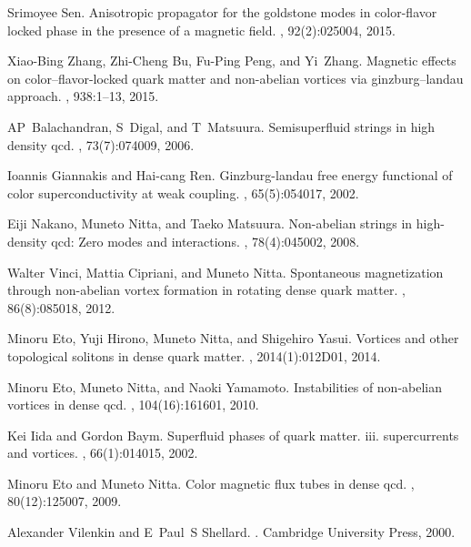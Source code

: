 \documentclass[prd, showpacs,nofootinbib,amsmath,amssymb]{revtex4}
\begin{document}
\begin{thebibliography}{99}
Srimoyee Sen.
\newblock Anisotropic propagator for the goldstone modes in color-flavor locked
  phase in the presence of a magnetic field.
, 92(2):025004, 2015.

Xiao-Bing Zhang, Zhi-Cheng Bu, Fu-Ping Peng, and Yi~Zhang.
\newblock Magnetic effects on color--flavor-locked quark matter and non-abelian
  vortices via ginzburg--landau approach.
, 938:1--13, 2015.

AP~Balachandran, S~Digal, and T~Matsuura.
\newblock Semisuperfluid strings in high density qcd.
, 73(7):074009, 2006.

Ioannis Giannakis and Hai-cang Ren.
\newblock Ginzburg-landau free energy functional of color superconductivity at
  weak coupling.
, 65(5):054017, 2002.

Eiji Nakano, Muneto Nitta, and Taeko Matsuura.
\newblock Non-abelian strings in high-density qcd: Zero modes and interactions.
, 78(4):045002, 2008.

Walter Vinci, Mattia Cipriani, and Muneto Nitta.
\newblock Spontaneous magnetization through non-abelian vortex formation in
  rotating dense quark matter.
, 86(8):085018, 2012.

Minoru Eto, Yuji Hirono, Muneto Nitta, and Shigehiro Yasui.
\newblock Vortices and other topological solitons in dense quark matter.
,
  2014(1):012D01, 2014.

Minoru Eto, Muneto Nitta, and Naoki Yamamoto.
\newblock Instabilities of non-abelian vortices in dense qcd.
, 104(16):161601, 2010.

Kei Iida and Gordon Baym.
\newblock Superfluid phases of quark matter. iii. supercurrents and vortices.
, 66(1):014015, 2002.



Minoru Eto and Muneto Nitta.
\newblock Color magnetic flux tubes in dense qcd.
, 80(12):125007, 2009.

Alexander Vilenkin and E~Paul~S Shellard.
.
\newblock Cambridge University Press, 2000.


\end{thebibliography}
\end{document}
